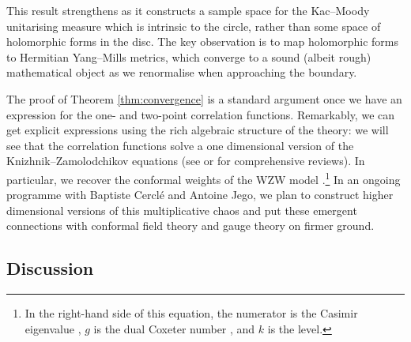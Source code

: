 \documentclass[12pt,a4paper]{amsart}
\numberwithin{equation}{section}
\theoremstyle{remark}
\newtheorem{remark}{Remark}
\theoremstyle{definition}
\renewcommand{\S}{\mathbb S}
\renewcommand{\d}{\mathrm d}
\begin{document}

This result strengthens \cite[Theorem 1]{Bav26} as it constructs a sample space for the Kac--Moody unitarising measure which is intrinsic to the circle, rather than some space of holomorphic forms in the disc. The key observation is to map holomorphic forms to Hermitian Yang--Mills metrics, which converge to a sound (albeit rough) mathematical object as we renormalise when approaching the boundary. %

 The proof of Theorem \ref{thm:convergence} is a standard argument once we have an expression for the one- and two-point correlation functions. Remarkably, we can get explicit expressions using the rich algebraic structure of the theory: we will see that the correlation functions solve a one dimensional version of the Knizhnik--Zamolodchikov equations (see \cite[Chapter~15]{dFMS_CFT-book} or \cite{EFK_KZ-lectures} for comprehensive reviews). In particular, we recover the conformal weights of the WZW model \cite[eq. (15.87)]{dFMS_CFT-book}.\footnote{In the right-hand side of this equation, the numerator is the Casimir eigenvalue \cite[eq. (13.127)]{dFMS_CFT-book}, $g$ is the dual Coxeter number \cite[eq. (13.35)]{dFMS_CFT-book}, and $k$ is the level.} In an ongoing programme with Baptiste Cercl\'e and Antoine Jego, we plan to construct higher dimensional versions of this multiplicative chaos and put these emergent connections with conformal field theory and gauge theory on firmer ground.


    \subsection{Discussion}
\end{document}
